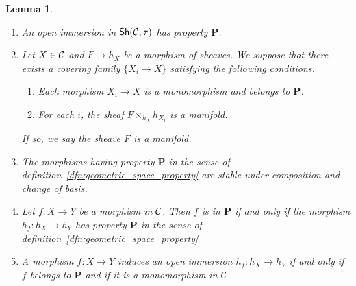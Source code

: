 \documentclass{tufte-book} %
\numberwithin{dummy}{section}
\newtheorem{lemma}[thm]{Lemma}
\newcommand{\calc}{{\cal C}}
\newcommand{\lrta}{\longrightarrow}
\newcommand{\ssh}{\mathsf{Sh}}
\newcommand{\bfp}{\mathbf{P}}
\begin{document}
\begin{lemma}
\ 
\begin{enumerate}
\item An open immersion in $\ssh(\calc,\tau)$ has property $\bfp$.
\item Let $X\in\calc$ and $F\lrta h_X$ be a morphism of sheaves. We suppose that there exists a covering family $\{X_i\lrta X\}$ satisfying the following conditions.
\begin{enumerate}[label=(\alph*)]
\item Each morphism $X_i\lrta X$ is a monomorphism  and belongs to $\bfp$.
\item For each $i$, the sheaf $F\times_{h_X}h_{X_i}$ is a manifold.
\end{enumerate}
If so, we say the sheave $F$ is a manifold.
\item The morphisms having property $\bfp$ in the sense of definition~\ref{dfn:geometric_space_property} are stable under composition and change of basis.
\item Let $f:X\lrta Y$ be  a morphism in $\calc$. Then $f$ is in $\bfp$ if and only if the morphism $h_f:h_X\lrta h_Y$ has property $\bfp$ in the sense of definition~\ref{dfn:geometric_space_property}
\item A morphism $f:X\lrta Y$ induces an open immersion $h_f:h_X\lrta h_Y$ if and only if $f$ belongs to  $\bfp$ and if it is a monomorphism in $\calc$.
\end{enumerate}
\end{lemma}
\end{document}
